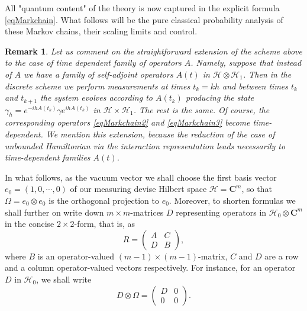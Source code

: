 \documentclass[12pt]{article}
\def\HC{\mathcal{H}}
\def\C{\mathbf{C}}
\def\ga{\gamma}
\newtheorem{remark}{Remark}
\newcommand{\Om}{\Omega}
\begin{document}
All "quantum content" of the theory is now captured in the explicit formula \eqref{eqMarkchain}.
What follows will be
the pure classical probability analysis of these Markov chains, their scaling limits and control.

\begin{remark}
\label{redtimedepder}
Let us comment on the straightforward extension of the scheme above to the case of time dependent family
of operators $A$. Namely, suppose that instead of $A$ we have a family of self-adjoint
operators $A(t)$ in $\HC\otimes \HC_1$. Then in the discrete scheme we perform measurements at times
 $t_k=kh$ and between times $t_k$ and $t_{k+1}$ the system evolves according to $A(t_k)$ producing the state
$\ga_h=e^{-ihA(t_k)}\ga e^{ihA(t_k)}$ in $\HC\times \HC_1$. The rest is the same.
Of course, the corresponding  operators \eqref{eqMarkchain2} and \eqref{eqMarkchain3}
become time-dependent. We mention this extension, because the reduction
of the case of unbounded Hamiltonian via the interaction representation leads
necessarily to time-dependent families $A(t)$.
\end{remark}

In what follows, as the vacuum vector we shall choose the first basis vector $e_0=(1,0,\cdots , 0)$
 of our measuring devise Hilbert space $\HC=\C^m$, so that $\Om =e_0\otimes e_0$
 is the orthogonal projection to $e_0$.
Moreover, to shorten formulas we shall further on write down $m\times m$-matrices
 $D$ representing operators in $\HC_0\otimes \C^m$
 in the concise $2\times 2$-form, that is, as
 \[
R= \begin{pmatrix}
A & C   \\
D & B
\end{pmatrix},
\]
where $B$ is an operator-valued  $(m-1)\times (m-1)$-matrix, $C$ and $D$ are a row
and a column operator-valued vectors respectively.
 For instance, for an operator $D$ in $\HC_0$, we shall write
 \[
D\otimes \Omega
=\begin{pmatrix}
D & 0   \\
0 & 0
\end{pmatrix}.
\]
\end{document}
